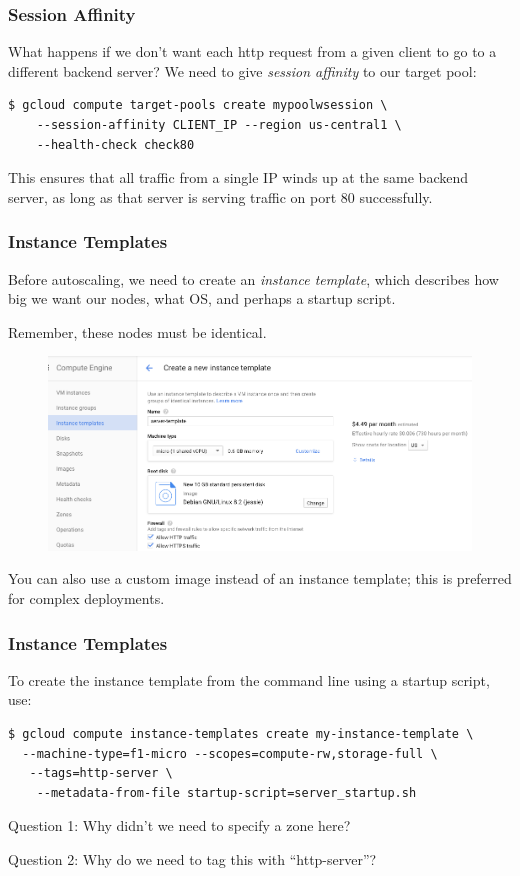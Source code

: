 \documentclass[9pt]{beamer}
\begin{document}
\begin{frame}[fragile]
  \frametitle{Session Affinity}
  What happens if we don't want each http request from a given client to go to a different backend server? We need to give \emph{session affinity} to our target pool:
  \begin{verbatim}
$ gcloud compute target-pools create mypoolwsession \
    --session-affinity CLIENT_IP --region us-central1 \
    --health-check check80
  \end{verbatim}
  This ensures that all traffic from a single IP winds up at the same backend server, as long as that server is serving traffic on port 80 successfully.
\end{frame}

\begin{frame}[fragile]
  \frametitle{Instance Templates}
  Before autoscaling, we need to create an \emph{instance template}, which describes how big we want our nodes, what OS, and perhaps a startup script.
  
  Remember, these nodes must be identical.
  \begin{figure}
    \includegraphics[scale=0.3]{figures/InstanceTemplate.png}
  \end{figure}
  You can also use a custom image instead of an instance template; this is preferred for complex deployments.
\end{frame}

\begin{frame}[fragile]
\frametitle{Instance Templates}
To create the instance template from the command line using a startup script, use:
\begin{verbatim}
$ gcloud compute instance-templates create my-instance-template \
  --machine-type=f1-micro --scopes=compute-rw,storage-full \
   --tags=http-server \
    --metadata-from-file startup-script=server_startup.sh
\end{verbatim}
Question 1: Why didn't we need to specify a zone here?

Question 2: Why do we need to tag this with ``http-server''?
\end{frame}
\end{document}
